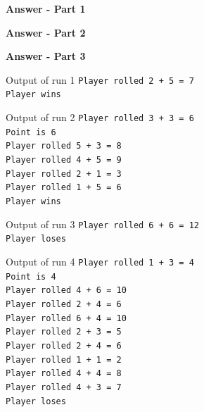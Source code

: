 \documentclass[10pt]{beamer}
\begin{document}
\begin{frame}
	
	{\scriptsize \textbf{Answer - Part 1}}
	
\end{frame}
\begin{frame}
	
	{\scriptsize \textbf{Answer - Part 2}}
	
\end{frame}
\begin{frame}
	
	{\scriptsize \textbf{Answer - Part 3}}
	
\end{frame}

\begin{frame}
	\begin{block}{\color{white}Output of run 1}
		\texttt{Player rolled 2 + 5 = 7\\
			Player wins}
	\end{block}
	\begin{block}{\color{white}Output of run 2}
		\texttt{Player rolled 3 + 3 = 6\\
			Point is 6\\
			Player rolled 5 + 3 = 8\\
			Player rolled 4 + 5 = 9\\
			Player rolled 2 + 1 = 3\\
			Player rolled 1 + 5 = 6\\
			Player wins}
	\end{block}
\end{frame}

\begin{frame}
	\begin{block}{\color{white}Output of run 3}
		\texttt{Player rolled 6 + 6 = 12\\
			Player loses}
	\end{block}
	\begin{block}{\color{white}Output of run 4}
		\texttt{Player rolled 1 + 3 = 4\\
			Point is 4\\
			Player rolled 4 + 6 = 10\\
			Player rolled 2 + 4 = 6\\
			Player rolled 6 + 4 = 10\\
			Player rolled 2 + 3 = 5\\
			Player rolled 2 + 4 = 6\\
			Player rolled 1 + 1 = 2\\
			Player rolled 4 + 4 = 8\\
			Player rolled 4 + 3 = 7\\
			Player loses}
	\end{block}
\end{frame}
\end{document}

